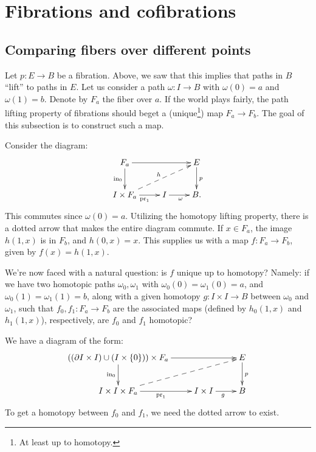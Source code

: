 \section{Fibrations and cofibrations}
\subsection{Comparing fibers over different points}
Let $p:E\to B$ be a fibration.
Above, we saw that this implies that paths in $B$ ``lift'' to paths in $E$.
Let us consider a path $\omega:I\to B$ with $\omega(0) = a$ and $\omega(1) = b$.
Denote by $F_a$ the fiber over $a$. 
If the world plays fairly, the path lifting property of fibrations should beget a (unique\footnote{At least up to homotopy.})
map $F_a\to F_b$.
The goal of this subsection is to construct such a map.

Consider the diagram:
\begin{equation*}
    \xymatrix{
	F_a\ar[d]_{\mathrm{in}_0}\ar[rr] & & E\ar[d]^p\\
	I\times F_a\ar@{-->}[urr]^{h}\ar[r]_{\mathrm{pr}_1} & I\ar[r]_{\omega} & B.
    }
\end{equation*}
This commutes since $\omega(0) = a$.
Utilizing the homotopy lifting property, there is a dotted arrow that makes the entire diagram commute.
If $x\in F_a$, the image $h(1,x)$ is in $F_b$, and $h(0,x) = x$.
This supplies us with a map $f:F_a\to F_b$, given by $f(x) = h(1,x)$.

We're now faced with a natural question: is $f$ unique up to homotopy?
Namely: if we have two homotopic paths $\omega_0,\omega_1$ with $\omega_0(0) = \omega_1(0) = a$,
and $\omega_0(1) = \omega_1(1) = b$, along with a given homotopy $g:I\times I\to B$ between $\omega_0$ and $\omega_1$,
such that $f_0,f_1:F_a \to F_b$ are the associated maps (defined by $h_0(1,x)$ and $h_1(1,x)$),
respectively, are $f_0$ and $f_1$ homotopic?

We have a diagram of the form:
\begin{equation*}
    \xymatrix{
	((\partial I\times I)\cup (I\times \{0\}))\times F_a\ar[d]_{\mathrm{in}_0}\ar[rr] & & E\ar[d]^p\\
	I\times I\times F_a\ar[r]_{\mathrm{pr}_1}\ar@{-->}[urr] & I\times I\ar[r]_g & B
    }
\end{equation*}
To get a homotopy between $f_0$ and $f_1$, we need the dotted arrow to exist.


